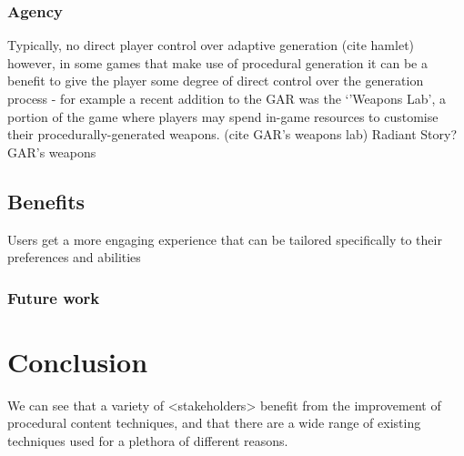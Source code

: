 \documentclass{acm_proc_article-sp}
\begin{document}
\subsubsection{Agency}
Typically, no direct player control over adaptive generation (cite hamlet)
however, in some games that make use of procedural generation it can be a benefit to give the player some degree of direct control over the generation process - for example a recent addition to the GAR was the `'Weapons Lab', a portion of the game where players may spend in-game resources to customise their procedurally-generated weapons. (cite GAR's weapons lab)
Radiant Story?
GAR's weapons

\subsection{Benefits}
Users get a more engaging experience that can be tailored specifically to their preferences and abilities
\subsubsection{Future work}

\section{Conclusion}
We can see that a variety of <stakeholders> benefit from the improvement of procedural content techniques, and that there are a wide range of existing techniques used for a plethora of different reasons.




\balancecolumns
\end{document}
